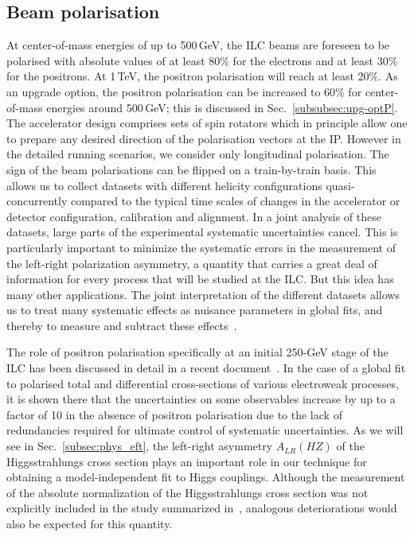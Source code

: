 \subsection{Beam polarisation}
\label{subsec:runscen_pol}
At center-of-mass energies of up to 500\,GeV, the ILC beams are foreseen to be polarised  with absolute values of at least 80\% for the electrons and at least 30\% for the positrons. At 1\,TeV, the positron polarisation will reach at least 20\%. As an upgrade option, the positron polarisation can be increased to 60\% for center-of-mass energies around 500\,GeV; this is discussed in Sec.~\ref{subsubsec:upg-optP}. The accelerator design comprises sets of spin rotators which in principle allow one to prepare any desired direction of the polarisation vectors at the IP. However in the detailed running scenarios, we consider only longitudinal polarisation. The sign of the beam polarisations can be flipped 
on a train-by-train basis. This allows us to collect datasets with different helicity configurations quasi-concurrently compared to the typical time scales of changes in the accelerator or detector configuration, calibration and alignment. In a joint analysis of these datasets, large parts of the experimental systematic uncertainties cancel.  This is particularly important to minimize the 
systematic errors in the measurement of the left-right polarization asymmetry, a quantity that carries a great deal of information for every process that will be studied at the ILC.  But this idea has many other applications. The joint interpretation of the different datasets allows us to treat many systematic effects as nuisance parameters in global fits, and thereby to measure and subtract these effects~\cite{bib:PhDRobert}. 

The role of positron polarisation specifically at an initial 250-GeV stage of the ILC has been discussed in detail in a recent document~\cite{Fujii:2018mli}. In the case of a global fit to polarised total and differential cross-sections of various electroweak processes, it is shown there  that the uncertainties on some observables increase by up to a factor of 10 in the absence of positron polarisation due to the lack of redundancies required for ultimate control of systematic uncertainties. As we will see in Sec.~\ref{subsec:phys_eft}, the left-right asymmetry $A_{LR}(HZ)$ of the Higgsstrahlungs cross section plays an important role in our technique for obtaining a  model-independent fit to Higgs couplings.  Although the measurement of the absolute normalization of the Higgsstrahlungs cross section was not explicitly included in the study summarized in~\cite{Fujii:2018mli}, analogous deteriorations would also be expected for this quantity.

